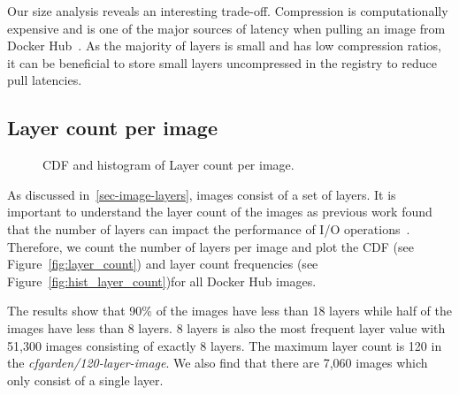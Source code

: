 Our size analysis reveals an interesting trade-off. Compression is
computationally expensive and is one of the major sources of latency when
pulling an image from Docker Hub~\cite{slacker}.  As the majority of layers is
small and has low compression ratios, it can be beneficial to store small
layers uncompressed in the registry to reduce pull latencies.

\subsection{Layer count per image}

\begin{figure}[!t]
	\centering
	\caption{CDF and histogram of Layer count per image.}
	\label{fig:image-size}
\end{figure}

As discussed in~\ref{sec-image-layers}, images consist of a set of layers.
It is important to understand the layer count of the images as previous
work found that the number of layers can impact the performance of
I/O operations~\cite{slacker}. Therefore, we count the number of layers
per image and plot the CDF (see Figure~\ref{fig:layer_count})
and layer count frequencies (see Figure~\ref{fig:hist_layer_count})for all
Docker Hub images.

The results show that 90\% of the images have less than 18 layers while
half of the images have less than 8 layers. 8 layers is also the most
frequent layer value with 51,300 images consisting of exactly 8 layers.
The maximum layer count is 120 in the \textit{cfgarden/120-layer-image}.
We also find that there are 7,060 images which only consist of a single layer.

